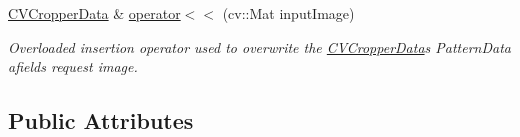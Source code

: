 \begin{DoxyCompactItemize}
\hyperlink{classfilter_1_1algos_1_1_cropper_1_1_c_v_cropper_data}{C\+V\+Cropper\+Data} \& \hyperlink{classfilter_1_1algos_1_1_cropper_1_1_c_v_cropper_data_a74dba06cb470f371cd3658f6a11021e6}{operator$<$$<$} (cv\+::\+Mat input\+Image)
\begin{DoxyCompactList}\small\item\em Overloaded insertion operator used to overwrite the \hyperlink{classfilter_1_1algos_1_1_cropper_1_1_c_v_cropper_data}{C\+V\+Cropper\+Data}\textquotesingle{}s Pattern\+Data afield\textquotesingle{}s request image. \end{DoxyCompactList}\end{DoxyCompactItemize}
\subsection*{Public Attributes}
